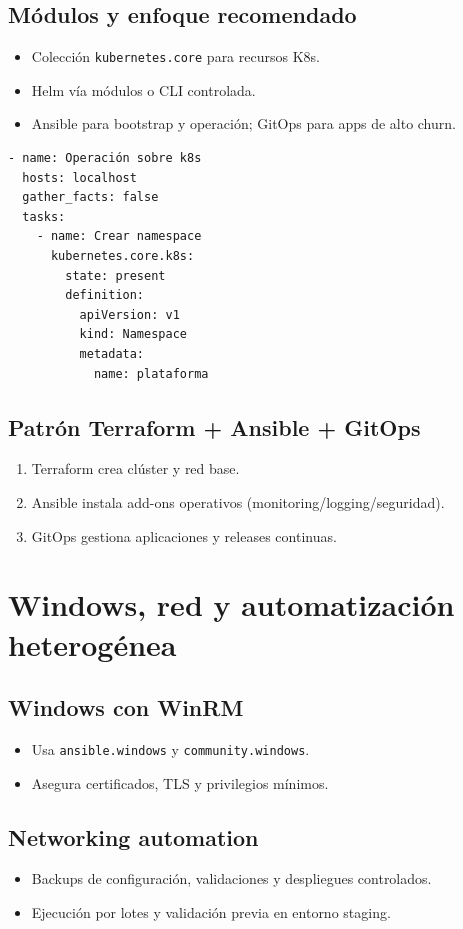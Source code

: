 \documentclass[12pt,a4paper]{article}
\begin{document}
\subsection{Módulos y enfoque recomendado}
\begin{itemize}
  \item Colección \texttt{kubernetes.core} para recursos K8s.
  \item Helm vía módulos o CLI controlada.
  \item Ansible para bootstrap y operación; GitOps para apps de alto churn.
\end{itemize}

\begin{lstlisting}[caption=Namespace + deployment simple]
- name: Operación sobre k8s
  hosts: localhost
  gather_facts: false
  tasks:
    - name: Crear namespace
      kubernetes.core.k8s:
        state: present
        definition:
          apiVersion: v1
          kind: Namespace
          metadata:
            name: plataforma
\end{lstlisting}

\subsection{Patrón Terraform + Ansible + GitOps}
\begin{enumerate}
  \item Terraform crea clúster y red base.
  \item Ansible instala add-ons operativos (monitoring/logging/seguridad).
  \item GitOps gestiona aplicaciones y releases continuas.
\end{enumerate}

\section{Windows, red y automatización heterogénea}

\subsection{Windows con WinRM}
\begin{itemize}
  \item Usa \texttt{ansible.windows} y \texttt{community.windows}.
  \item Asegura certificados, TLS y privilegios mínimos.
\end{itemize}

\subsection{Networking automation}
\begin{itemize}
  \item Backups de configuración, validaciones y despliegues controlados.
  \item Ejecución por lotes y validación previa en entorno staging.
\end{itemize}
\end{document}
